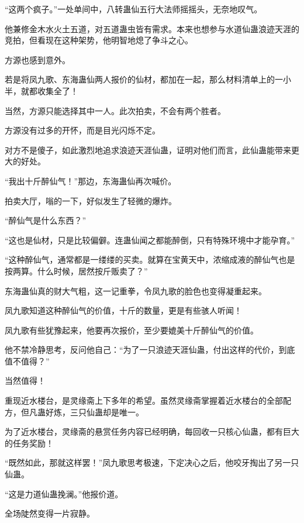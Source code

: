 \begin{this_body}
“这两个疯子。”一处单间中，八转蛊仙五行大法师摇摇头，无奈地叹气。

他兼修金木水火土五道，对五道蛊虫皆有需求。本来也想参与水道仙蛊浪迹天涯的竞拍，但看现在这种架势，他明智地熄了争斗之心。

方源也感到意外。

若是将凤九歌、东海蛊仙两人报价的仙材，都加在一起，那么材料清单上的一小半，就都收集全了！

当然，方源只能选择其中一人。此次拍卖，不会有两个胜者。

方源没有过多的开怀，而是目光闪烁不定。

对方不是傻子，如此激烈地追求浪迹天涯仙蛊，证明对他们而言，此仙蛊能带来更大的好处。

“我出十斤醉仙气！”那边，东海蛊仙再次喊价。

拍卖大厅，嗡的一下，好似发生了轻微的爆炸。

“醉仙气是什么东西？”

“这也是仙材，只是比较偏僻。连蛊仙闻之都能醉倒，只有特殊环境中才能孕育。”

“这种醉仙气，通常都是一缕缕的买卖。就算在宝黄天中，浓缩成液的醉仙气也是按两算。什么时候，居然按斤贩卖了？”

东海蛊仙真的财大气粗，这一记重拳，令凤九歌的脸色也变得凝重起来。

凤九歌知道这种醉仙气的价值，十斤的数量，更是有些骇人听闻！

凤九歌有些犹豫起来，他要再次报价，至少要媲美十斤醉仙气的价值。

他不禁冷静思考，反问他自己：“为了一只浪迹天涯仙蛊，付出这样的代价，到底值不值得？”

当然值得！

重现近水楼台，是灵缘斋上下多年的希望。虽然灵缘斋掌握着近水楼台的全部配方，但凡蛊好炼，三只仙蛊却是唯一。

为了近水楼台，灵缘斋的悬赏任务内容已经明确，每回收一只核心仙蛊，都有巨大的任务奖励！

“既然如此，那就这样罢！”凤九歌思考极速，下定决心之后，他咬牙掏出了另一只仙蛊。

“这是力道仙蛊挽澜。”他报价道。

全场陡然变得一片寂静。

\end{this_body}

